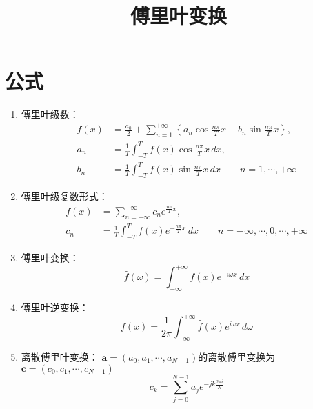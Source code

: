 \documentclass[12pt,a4paper]{article}
\title{傅里叶变换}
\author{}
\date{\chntoday}
\begin{document}
\maketitle
\newpage
\section{公式}
\begin{enumerate}[1.]
\item 傅里叶级数：
\begin{align*}
f(x)&=\frac{a_0}{2}+\sum_{n=1}^{+\infty}\left\{{a_n\cos{\frac{n\pi}{T}x}+b_n\sin{\frac{n\pi}{T}x}}\right\},\\
a_n&=\frac{1}{T}\int_{-T}^{T}{f(x)\cos{\frac{n\pi}{T}x}}\,dx,\\
b_n&=\frac{1}{T}\int_{-T}^{T}{f(x)\sin{\frac{n\pi}{T}x}}\,dx\qquad n=1,\cdots,+\infty
\end{align*}
\item 傅里叶级复数形式：
\begin{align*}
f(x)&=\sum_{n=-\infty}^{+\infty}{c_n e^{\frac{n\pi}{T}x}},\\
c_n&=\frac{1}{T}\int_{-T}^{T}{f(x)e^{-\frac{n\pi}{T}x}}\,dx\qquad n=-\infty,\cdots,0,\cdots,+\infty
\end{align*}
\item 傅里叶变换：
$$
\hat{f}(\omega)=\int_{-\infty}^{+\infty}{f(x)e^{-i\omega x}}\,dx
$$
\item 傅里叶逆变换：
$$
f(x)=\frac{1}{2\pi}\int_{-\infty}^{+\infty}{\hat{f}(x)e^{i\omega x}}\,d\omega
$$
\item 离散傅里叶变换：
$\boldsymbol{a}=(a_0,a_1,\cdots,a_{N-1})$的离散傅里变换为$\boldsymbol{c}=(c_0,c_1,\cdots,c_{N-1})$
$$
c_k=\sum_{j=0}^{N-1}{a_j e^{-jk\frac{2\pi i}{N}}}
$$
\end{enumerate}
\end{document}
